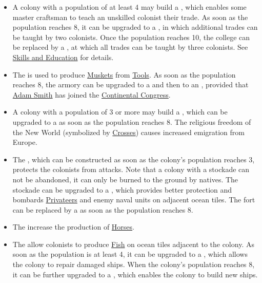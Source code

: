 \documentclass[12pt]{article}
\begin{document}
\begin{itemize}
\item A colony with a population of at least 4 may build a
  , which enables some master craftsman to teach
  an unskilled colonist their trade. As soon as the population reaches
  8, it can be upgraded to a , in which additional
  trades can be taught by two colonists. Once the population reaches
  10, the college can be replaced by a , at which
  all trades can be taught by three colonists. See \hyperlink{Skills
  and Education}{Skills and Education} for details.

\item The  is used to produce
  \hyperlink{Muskets}{Muskets} from \hyperlink{Tools}{Tools}. As soon
  as the population reaches 8, the armory can be upgraded to a
   and then to an , provided that
  \hyperlink{Adam Smith}{Adam Smith} has joined the
  \hyperlink{Continental Congress}{Continental Congress}.

\item A colony with a population of 3 or more may build a
  , which can be upgraded to a 
  as soon as the population reaches 8. The religious freedom of the
  New World (symbolized by \hyperlink{Crosses}{Crosses}) causes
  increased emigration from Europe.

\item The , which can be constructed as soon as the
  colony's population reaches 3, protects the colonists from
  attacks. Note that a colony with a stockade can not be abandoned, it
  can only be burned to the ground by natives. The stockade can be
  upgraded to a , which provides better protection and
  bombards \hyperlink{Privateer}{Privateers} and enemy naval units on
  adjacent ocean tiles. The fort can be replaced by a
   as soon as the population reaches 8.

\item The  increase the production of
  \hyperlink{Horses}{Horses}.

\item The  allow colonists to produce
  \hyperlink{Fish}{Fish} on ocean tiles adjacent to the colony. As
  soon as the population is at least 4, it can be upgraded to a
  , which allows the colony to repair damaged
  ships. When the colony's population reaches 8, it can be further
  upgraded to a , which enables the colony to build
  new ships.


\end{itemize}
\end{document}
